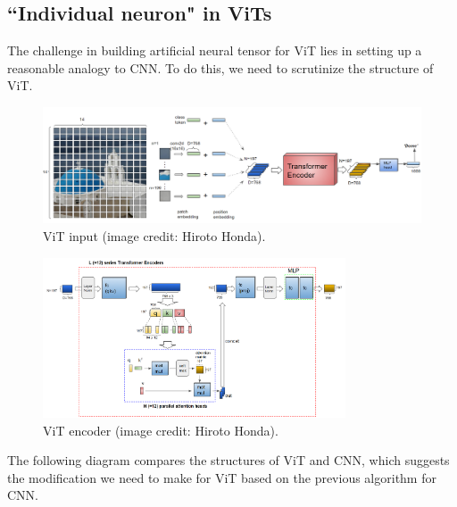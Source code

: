 \subsection{``Individual neuron" in ViTs}
The challenge in building artificial neural tensor for ViT lies in setting up a reasonable analogy to CNN. To do this, we need to scrutinize the structure of ViT. 
\begin{figure}[H]
    \centering
        \includegraphics[width=\textwidth]{figures/artificial/vit_input.png}
        \caption{ViT input (image credit: Hiroto Honda).}
\end{figure}
    \begin{figure}[H]
    \centering
        \includegraphics[width=0.8\textwidth]{figures/artificial/vit_encoder.png}
        \caption{ViT encoder (image credit: Hiroto Honda).}
\end{figure}

The following diagram compares the structures of ViT and CNN, which suggests the modification we need to make for ViT based on the previous algorithm for CNN.

